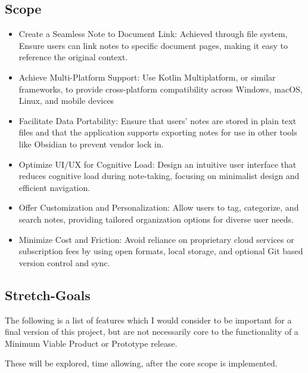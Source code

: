 \subsection{Scope}
\begin{itemize}
    \item Create a Seamless Note to Document Link: Achieved through file system,  Ensure users can link notes to specific document pages, making it easy to reference the original context.
    \item Achieve Multi-Platform Support: Use Kotlin Multiplatform, or similar frameworks, to provide cross-platform compatibility across Windows, macOS, Linux, and mobile devices
    \item Facilitate Data Portability: Ensure that users' notes are stored in plain text files and that the application supports exporting notes for use in other tools like Obsidian to prevent vendor lock in. 
    \item Optimize UI/UX for Cognitive Load: Design an intuitive user interface that reduces cognitive load during note-taking, focusing on minimalist design and efficient navigation.
    \item Offer Customization and Personalization: Allow users to tag, categorize, and search notes, providing tailored organization options for diverse user needs.
    \item Minimize Cost and Friction: Avoid reliance on proprietary cloud services or subscription fees by using open formats, local storage, and optional Git based version control and sync.
\end{itemize}

\subsection{Stretch-Goals}
The following is a list of features which I would consider to be important for a final version of this project, but are not necessarily core to the functionality of a Minimum Viable Product or Prototype release. 

These will be explored, time allowing, after the core scope is implemented. 

